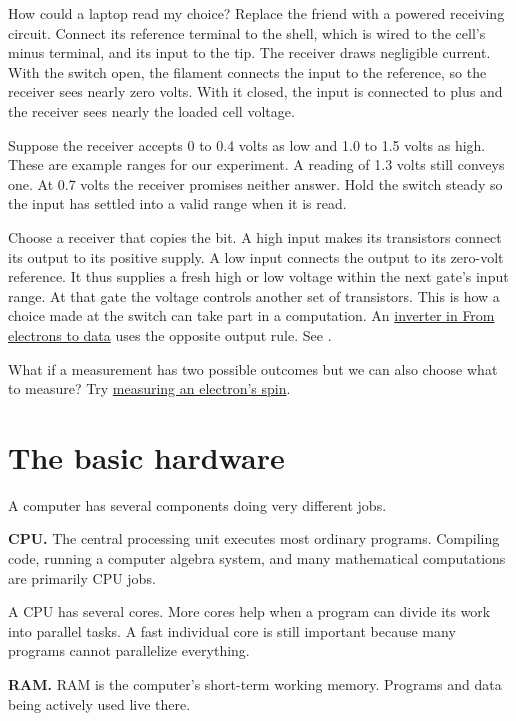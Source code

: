 How could a laptop read my choice? Replace
the friend with a powered receiving circuit.
Connect its reference terminal to the shell,
which is wired to the cell's minus terminal,
and its input to the tip. The receiver draws
negligible current. With the switch open, the
filament connects the input to the reference,
so the receiver sees nearly zero volts. With
it closed, the input is connected to plus and
the receiver sees nearly the loaded cell
voltage.

Suppose the receiver accepts 0 to 0.4 volts
as low and 1.0 to 1.5 volts as high. These
are example ranges for our experiment. A
reading of 1.3 volts still conveys one. At
0.7 volts the receiver promises neither
answer. Hold the switch steady so the input
has settled into a valid range when it is
read.

Choose a receiver that copies the bit. A high
input makes its transistors connect its
output to its positive supply. A low input
connects the output to its zero-volt
reference. It thus supplies a fresh high or
low voltage within the next gate's input
range. At that gate the voltage controls
another set of transistors. This is how a
choice made at the switch can take part in a
computation. An
\href{https://www.heap-project.org/tag/0HHN}
{inverter in From electrons to data}
uses the opposite output rule.
See \cite[Sections 1.6.2--1.6.3]
{harris-digital-design}.

What if a measurement has two possible
outcomes but we can also choose what to
measure? Try
\href{https://www.heap-project.org/tag/0HHM}
{measuring an electron's spin}.

\section{The basic hardware}
\label{section-computing-systems-hardware}

A computer has several components doing
very different jobs.

\medskip\noindent
{\bf CPU.}
The central processing unit executes most
ordinary programs.  Compiling code,
running a computer algebra system, and
many mathematical computations are
primarily CPU jobs.

A CPU has several cores.  More cores help
when a program can divide its work into
parallel tasks.  A fast individual core is
still important because many programs
cannot parallelize everything.

\medskip\noindent
{\bf RAM.}
RAM is the computer's short-term working
memory.  Programs and data being actively
used live there.

